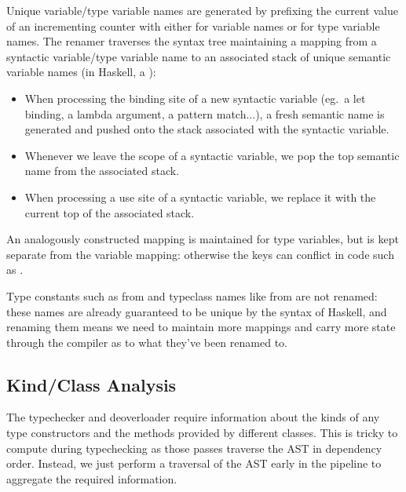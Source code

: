 \documentclass[dissertation.tex]{subfiles}
\begin{document}
{{        Unique variable/type variable names are generated by prefixing the current value of an incrementing counter with
        either  for variable names or  for type variable names. The renamer traverses the syntax
        tree maintaining a mapping from a syntactic variable/type variable name to an associated stack of unique
        semantic variable names (in Haskell, a ):

        \begin{itemize}
        \item When processing the binding site of a new syntactic variable (eg.\ a let binding, a lambda argument, a
        pattern match...), a fresh semantic name is generated and pushed onto the stack associated with the syntactic
        variable.
        \item Whenever we leave the scope of a syntactic variable, we pop the top semantic name from the associated
        stack.
        \item When processing a use site of a syntactic variable, we replace it with the current top of the
        associated stack.
        \end{itemize}

        An analogously constructed mapping is maintained for type variables, but is kept separate from the variable
        mapping: otherwise the keys can conflict in code such as .

        Type constants such as  from  and typeclass names like
         from  are not renamed: these names are already guaranteed to be
        unique by the syntax of Haskell, and renaming them means we need to maintain more mappings and carry more state
        through the compiler as to what they've been renamed to.

    }
    \subsection{Kind/Class Analysis}
    {

        The typechecker and deoverloader require information about the kinds of any type constructors and the methods
        provided by different classes. This is tricky to compute during typechecking as those passes traverse the AST in
        dependency order. Instead, we just perform a traversal of the AST early in the pipeline to aggregate the
        required information.

}}
\end{document}
